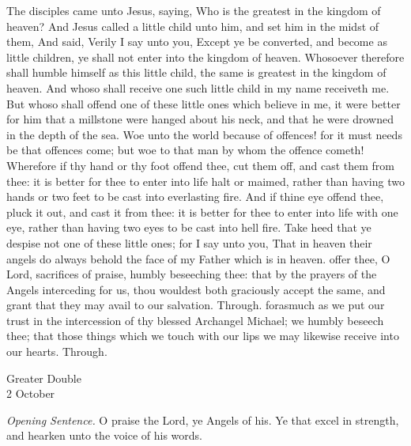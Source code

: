  The disciples came unto Jesus, saying, Who is the greatest in the kingdom of heaven? And Jesus called a little child unto him, and set him in the midst of them, And said, Verily I say unto you, Except ye be converted, and become as little children, ye shall not enter into the kingdom of heaven. Whosoever therefore shall humble himself as this little child, the same is greatest in the kingdom of heaven. And whoso shall receive one such little child in my name receiveth me. But whoso shall offend one of these little ones which believe in me, it were better for him that a millstone were hanged about his neck, and that he were drowned in the depth of the sea. Woe unto the world because of offences! for it must needs be that offences come; but woe to that man by whom the offence cometh! Wherefore if thy hand or thy foot offend thee, cut them off, and cast them from thee: it is better for thee to enter into life halt or maimed, rather than having two hands or two feet to be cast into everlasting fire. And if thine eye offend thee, pluck it out, and cast it from thee: it is better for thee to enter into life with one eye, rather than having two eyes to be cast into hell fire. Take heed that ye despise not one of these little ones; for I say unto you, That in heaven their angels do always behold the face of my Father which is in heaven.
\secret
{} offer thee, O Lord, sacrifices of praise, humbly beseeching thee: that by the prayers of the Angels interceding for us, thou wouldest both graciously accept the same, and grant that they may avail to our salvation. Through.
\postcommunion
{} forasmuch as we put our trust in the intercession of thy blessed Archangel Michael; we humbly beseech thee; that those things which we touch with our lips we may likewise receive into our hearts. Through.


\begin{inhead}
	{Greater Double\\
		2 October}
\end{inhead}
\par\noindent
\textit{Opening Sentence.} O praise the Lord, ye Angels of his. Ye that excel in strength, and hearken unto the voice of his words.

